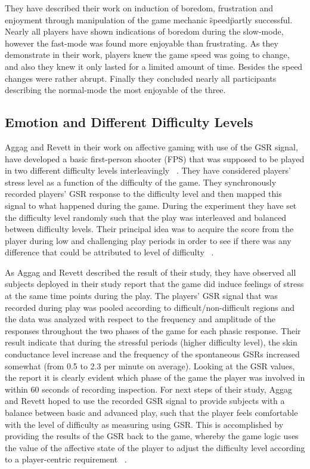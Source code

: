 They have described their work on induction of boredom, frustration and enjoyment through manipulation of the game mechanic \"speed\" partly successful. Nearly all players have shown indications of boredom during the slow-mode, however the fast-mode was found more enjoyable than frustrating. As they demonstrate in their work, players knew the game speed was going to change, and also they knew it only lasted for a limited amount of time. Besides the speed changes were rather abrupt. Finally they concluded nearly all participants describing the normal-mode the most enjoyable of the three.

\subsection{Emotion and Different Difficulty Levels}
Aggag and Revett in their work on affective gaming with use of the GSR signal, have developed a basic first-person shooter (FPS) that was supposed to be played in two different difficulty levels interleavingly ~\cite{aggag2011affective}. They have considered players' stress level as a function of the difficulty of the game. They synchronously recorded players' GSR response to the difficulty level and then mapped this signal to what happened during the game. During the experiment they have set the difficulty level randomly such that the play was interleaved and balanced between difficulty levels. Their principal idea was to acquire the score from the player during low and challenging play periods in order to see if there was any difference that could be attributed to level of difficulty ~\cite{aggag2011affective}.

As Aggag and Revett described the result of their study, they have observed all subjects deployed in their study report that the game did induce feelings of stress at the same time points during the play. The players' GSR signal that was recorded during play was pooled according to difficult/non-difficult regions and the data was analyzed with respect to the frequency and amplitude of the responses throughout the two phases of the game for each phasic response. Their result indicate that during the stressful periods (higher difficulty level), the skin conductance level increase and the frequency of the spontaneous GSRs increased somewhat (from 0.5 to 2.3 per minute on average). Looking at the GSR values, the report it is clearly evident which phase of the game the player was involved in within 60 seconds of recording inspection. For next steps of their study, Aggag and Revett hoped to use the recorded GSR signal to provide subjects with a balance between basic and advanced play, such that the player feels comfortable with the level of difficulty as measuring using GSR. This is accomplished by providing the results of the GSR back to the game, whereby the game logic uses the value of the affective state of the player to adjust the difficulty level according to a player-centric requirement ~\cite{aggag2011affective}.

